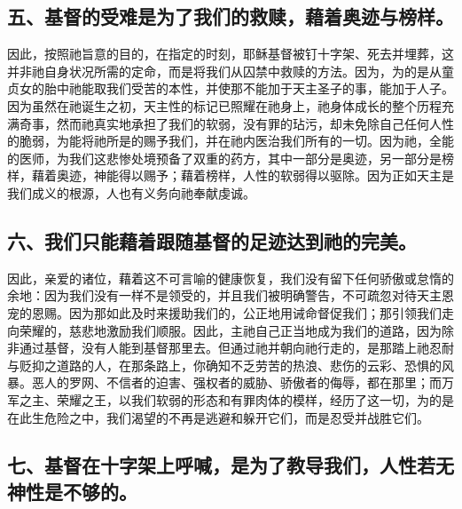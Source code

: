 
\subsection{五、基督的受难是为了我们的救赎，藉着奥迹与榜样。}

因此，按照祂旨意的目的，在指定的时刻，耶稣基督被钉十字架、死去并埋葬，这并非祂自身状况所需的定命，而是将我们从囚禁中救赎的方法。因为，为的是从童贞女的胎中祂能取我们受苦的本性，并使那不能加于天主圣子的事，能加于人子。因为虽然在祂诞生之初，天主性的标记已照耀在祂身上，祂身体成长的整个历程充满奇事，然而祂真实地承担了我们的软弱，没有罪的玷污，却未免除自己任何人性的脆弱，为能将祂所是的赐予我们，并在祂内医治我们所有的一切。因为祂，全能的医师，为我们这悲惨处境预备了双重的药方，其中一部分是奥迹，另一部分是榜样，藉着奥迹，神能得以赐予；藉着榜样，人性的软弱得以驱除。因为正如天主是我们成义的根源，人也有义务向祂奉献虔诚。\par


\subsection{六、我们只能藉着跟随基督的足迹达到祂的完美。}

因此，亲爱的诸位，藉着这不可言喻的健康恢复，我们没有留下任何骄傲或怠惰的余地：因为我们没有一样不是领受的，并且我们被明确警告，不可疏忽对待天主恩宠的恩赐。因为那如此及时来援助我们的，公正地用诫命督促我们；那引领我们走向荣耀的，慈悲地激励我们顺服。因此，主祂自己正当地成为我们的道路，因为除非通过基督，没有人能到基督那里去。但通过祂并朝向祂行走的，是那踏上祂忍耐与贬抑之道路的人，在那条路上，你确知不乏劳苦的热浪、悲伤的云彩、恐惧的风暴。恶人的罗网、不信者的迫害、强权者的威胁、骄傲者的侮辱，都在那里；而万军之主、荣耀之王，以我们软弱的形态和有罪肉体的模样，经历了这一切，为的是在此生危险之中，我们渴望的不再是逃避和躲开它们，而是忍受并战胜它们。\par


\subsection{七、基督在十字架上呼喊，是为了教导我们，人性若无神性是不够的。}

